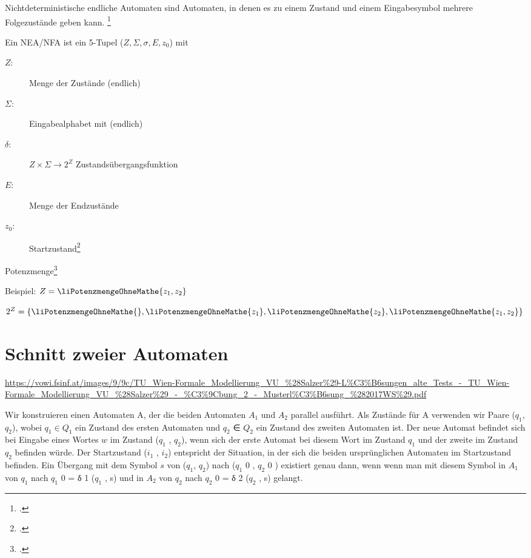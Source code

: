 \documentclass{lehramt-informatik-haupt}
\begin{document}
\begin{center}
\end{center}

Nichtdeterministische endliche Automaten sind Automaten, in denen es zu
einem Zustand und einem Eingabesymbol mehrere Folgezustände geben kann.
\footcite[Seite 28]{vossen}

Ein NEA/NFA ist ein 5-Tupel ($Z, \Sigma, \sigma, E, z_0$) mit

\begin{description}
\item[$Z$:] Menge der Zustände (endlich)
\item[$\Sigma$:] Eingabealphabet mit (endlich)
\item[$\delta$:] $Z \times \Sigma \rightarrow 2^Z$ Zustandsübergangsfunktion
\item[$E$:] Menge der Endzustände
\item[$z_0$:] Startzustand\footcite[Seite 30]{theo:fs:1}
\end{description}

Potenzmenge\footcite{wiki:potenzmenge}

\let\p=\liPotenzmengeOhneMathe

Beispiel: $Z = \p{ z_1, z_2 }$

$2^Z = \{\p{}, \p{z_1 }, \p{z_2 }, \p{z_1 , z_2 }\}$

\section{Schnitt zweier Automaten}

\url{https://vowi.fsinf.at/images/9/9c/TU_Wien-Formale_Modellierung_VU_%28Salzer%29-L%C3%B6sungen_alte_Tests_-_TU_Wien-Formale_Modellierung_VU_%28Salzer%29_-_%C3%9Cbung_2_-_Musterl%C3%B6sung_%282017WS%29.pdf}

Wir konstruieren einen Automaten A, der die beiden Automaten $A_1$ und
$A_2$ parallel ausführt. Als Zustände für A verwenden wir Paare ($q_1$,
$q_2$), wobei $q_1 \in Q_1$ ein Zustand des ersten Automaten und $q_2$
∈ $Q_2$ ein Zustand des zweiten Automaten ist. Der neue Automat befindet
sich bei Eingabe eines Wortes $w$ im Zustand ($q_1$ , $q_2$), wenn sich
der erste Automat bei diesem Wort im Zustand $q_1$ und der zweite im
Zustand $q_2$ befinden würde. Der Startzustand ($i_1$ , $i_2$)
entspricht der Situation, in der sich die beiden ursprünglichen
Automaten im Startzustand befinden. Ein Übergang mit dem Symbol $s$ von
($q_1$, $q_2$) nach ($q_1$ 0 , $q_2$ 0 ) existiert genau dann, wenn
wenn man mit diesem Symbol in $A_1$
von $q_1$ nach $q_1$ 0 = δ 1 ($q_1$ , s) und in $A_2$ von $q_2$ nach
$q_2$ 0 = δ 2 ($q_2$ , s) gelangt.
\end{document}
